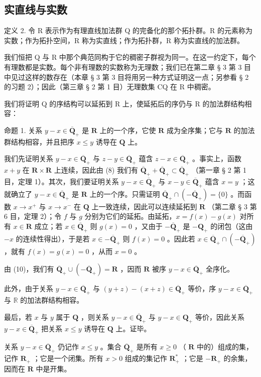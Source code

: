 \subsection{实直线与实数}

定义 2. 令 R 表示作为有理直线加法群 Q 的完备化的那个拓扑群。R 的元素称为实数；作为拓扑空间，R 称为实直线；作为拓扑群，R 称为实直线的加法群。

我们恒把 Q 与 R 中那个典范同构于它的稠密子群视为同一。在这一约定下，每个有理数都是实数。每个非有理数的实数称为无理数；我们已在第二章 § 3 第 3 目中见过这样的数存在（本章 § 3 第 3 目将用另一种方式证明这一点；另参看 § 2 的习题 2）；因此（第三章 § 2 第 1 目）无理数集 CQ 在 R 中稠密。

我们将证明 Q 的序结构可以延拓到 R 上，使延拓后的序仍与 R 的加法群结构相容：

命题 1. 关系 \(y - x \in \overline{\mathbf{Q}}_+\) 是 \(\mathbf{R}\) 上的一个序，它使 \(\mathbf{R}\) 成为全序集；它与 \(\mathbf{R}\) 的加法群结构相容，并且把序 \(x \leqslant y\) 诱导在 \(\mathbf{Q}\) 上。

我们先证明关系 \(y - x \in \overline{\mathbf{Q}}_+\) 与 \(z - y \in \overline{\mathbf{Q}}_+\) 蕴含 \(z - x \in \overline{\mathbf{Q}}_+\) 。事实上，函数 \(x + y\) 在 \(\mathbf{R} \times \mathbf{R}\) 上连续，因此由 (8) 我们有 \(\overline{\mathbf{Q}}_+ + \overline{\mathbf{Q}}_+ \subset \overline{\mathbf{Q}}_+\) （第一章 § 2 第 1 目，定理 1）。其次，我们要证明关系 \(y - x \in \overline{\mathbf{Q}}_+\) 与 \(x - y \in \overline{\mathbf{Q}}_+\) 蕴含 \(x = y\) ；这就确立了 \(y - x \in \overline{\mathbf{Q}}_+\) 是 \(\mathbf{R}\) 上的一个序。只需证明 \(\overline{\mathbf{Q}}_+ \cap (-\overline{\mathbf{Q}}_+) = \{0\}\) 。而函数 \(x \to x^+\) 与 \(x \to x^-\) 在 \(\mathbf{Q}\) 上一致连续，因此可以连续延拓到 \(\mathbf{R}\) （第二章 § 3 第 6 目，定理 2）；令 \(f\) 与 \(g\) 分别为它们的延拓。由延拓，\(x = f(x) - g(x)\) 对所有 \(x \in \mathbf{R}\) 成立；若 \(x \in \overline{\mathbf{Q}}_+\) 则 \(g(x) = 0\) ，又由于 \(-\overline{\mathbf{Q}}_+\) 是 \(-\mathbf{Q}_+\) 的闭包（这由 \(-x\) 的连续性得出），于是若 \(x \in -\overline{\mathbf{Q}}_+\) 则 \(f(x) = 0\) 。因此若 \(x \in \overline{\mathbf{Q}}_+ \cap (-\overline{\mathbf{Q}}_+)\) ，就有 \(f(x) = g(x) = 0\) ，从而 \(x = 0\) 。

由 (10)，我们有 \(\overline{\mathbf{Q}}_{+} \cup (-\overline{\mathbf{Q}}_{+}) = \mathbf{R}\) ，因而 \(\mathbf{R}\) 被序 \(y - x \in \overline{\mathbf{Q}}_{+}\) 全序化。

此外，由于关系 \(y - x \in \overline{\mathbf{Q}}_+\) 与 \((y + z) - (x + z) \in \overline{\mathbf{Q}}_+\) 等价，序 \(y - x \in \overline{\mathbf{Q}}_+\) 与 \(\mathbb{R}\) 的加法群结构相容。

最后，若 \(x\) 与 \(y\) 属于 \(\mathbf{Q}\) ，则关系 \(y - x \in \overline{\mathbf{Q}}_+\) 与 \(y - x \in \mathbf{Q}_+\) 等价，因此关系 \(y - x \in \overline{\mathbf{Q}}_+\) 把关系 \(x \leqslant y\) 诱导在 \(\mathbf{Q}\) 上。证毕。

关系 \(y - x \in \overline{\mathbf{Q}}_+\) 仍记作 \(x \leqslant y\) 。集合 \(\overline{\mathbf{Q}}_+\) 是所有 \(x \geqslant 0\) （ \(\mathbf{R}\) 中的）组成的集，记作 \(\mathbf{R}_+\) ；它是一个闭集。所有 \(x > 0\) 组成的集记作 \(\mathbf{R}_+^*\) ；它是 \(-\mathbf{R}_+\) 的余集，因而在 \(\mathbf{R}\) 中是开集。

